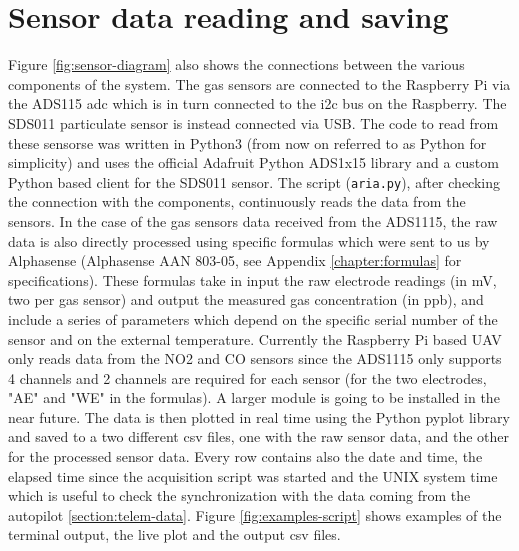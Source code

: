 \section{Sensor data reading and saving}
\label{section:software}
Figure \ref{fig:sensor-diagram} also shows the connections between the various components of the system. The gas sensors are connected to the Raspberry Pi via the ADS115 \gls{adc} which is in turn connected to the i2c bus on the Raspberry. The SDS011 particulate sensor is instead connected via USB.
The code to read from these sensorse was written in Python3 (from now on referred to as Python for simplicity) and uses the official Adafruit Python ADS1x15 library and a custom Python based client for the SDS011 sensor.
The script (\texttt{aria.py}), after checking the connection with the components, continuously reads the data from the sensors. In the case of the gas sensors data received from the ADS1115, the raw data is also directly processed using specific formulas which were sent to us by Alphasense (Alphasense AAN 803-05, see Appendix \ref{chapter:formulas} for specifications). These formulas take in input the raw electrode readings (in mV, two per gas sensor) and output the measured gas concentration (in ppb), and include a series of parameters which depend on the specific serial number of the sensor and on the external temperature. Currently the Raspberry Pi based UAV only reads data from the NO2 and CO sensors since the ADS1115 only supports 4 channels and 2 channels are required for each sensor (for the two electrodes, "AE" and "WE" in the formulas). A larger module is going to be installed in the near future.
The data is then plotted in real time using the Python pyplot library and saved to a two different csv files, one with the raw sensor data, and the other for the processed sensor data. Every row contains also the date and time, the elapsed time since the acquisition script was started and the UNIX system time which is useful to check the synchronization with the data coming from the autopilot \ref{section:telem-data}. Figure \ref{fig:examples-script} shows examples of the terminal output, the live plot and the output csv files.
